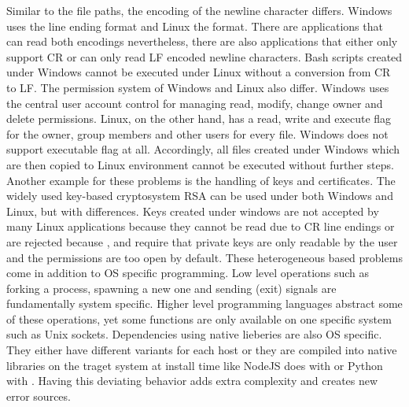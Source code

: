 \documentclass[12pt, a4paper]{article}
\begin{document}
        Similar to the file paths, the encoding of the newline character differs. Windows uses the  line ending format and Linux the  format. There are applications that can read both encodings nevertheless, there are also applications that either only support CR or can only read LF encoded newline characters. Bash scripts created under Windows cannot be executed under Linux without a conversion from CR to LF. The permission system of Windows and Linux also differ. Windows uses the central user account control for managing read, modify, change owner and delete permissions. Linux, on the other hand, has a read, write and execute flag for the owner, group members and other users for every file. Windows does not support executable flag at all. Accordingly, all files created under Windows which are then copied to Linux environment cannot be executed without further steps. Another example for these problems is the handling of keys and certificates. The widely used key-based cryptosystem \ac{RSA} can be used under both Windows and Linux, but with differences. Keys created under windows are not accepted by many Linux applications because they cannot be read due to CR line endings or are rejected because ,  and  require that private keys are only readable by the user and the permissions are too open by default.\newline
        These heterogeneous based problems come in addition to \acl{OS} specific programming. Low level operations such as forking a process, spawning a new one and sending (exit) signals are fundamentally system specific. Higher level programming languages abstract some of these operations, yet some functions are only available on one specific system such as Unix sockets. Dependencies using native lieberies are also \ac{OS} specific. They either have different variants for each host or they are compiled into native libraries on the traget system at install time like NodeJS does with  or Python with . Having this deviating behavior adds extra complexity and creates new error sources.
\end{document}
